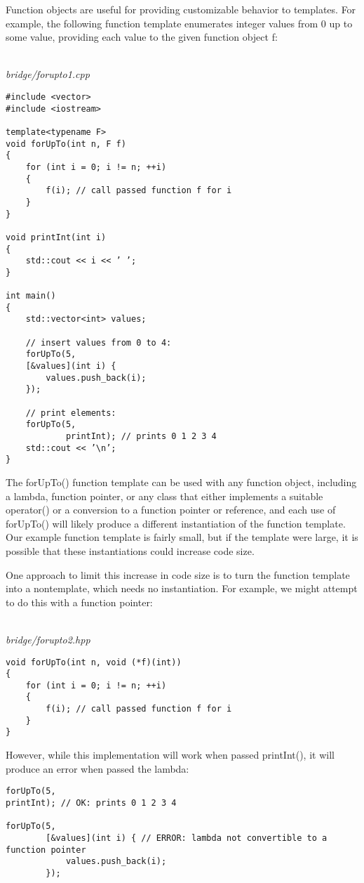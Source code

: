 
Function objects are useful for providing customizable behavior to templates. For example, the following function template enumerates integer values from 0 up to some value, providing each value to the given function object f:

\hspace*{\fill} \\ %
\noindent
\textit{bridge/forupto1.cpp}
\begin{lstlisting}[style=styleCXX]
#include <vector>
#include <iostream>

template<typename F>
void forUpTo(int n, F f)
{
	for (int i = 0; i != n; ++i)
	{
		f(i); // call passed function f for i
	}
}

void printInt(int i)
{
	std::cout << i << ’ ’;
}

int main()
{
	std::vector<int> values;
	
	// insert values from 0 to 4:
	forUpTo(5,
	[&values](int i) {
		values.push_back(i);
	});

	// print elements:
	forUpTo(5,
			printInt); // prints 0 1 2 3 4
	std::cout << ’\n’;
}
\end{lstlisting}

The forUpTo() function template can be used with any function object, including a lambda, function pointer, or any class that either implements a suitable operator() or a conversion to a function pointer or reference, and each use of forUpTo() will likely produce a different instantiation of the function template. Our example function template is fairly small, but if the template were large, it is possible that these instantiations could increase code size.

One approach to limit this increase in code size is to turn the function template into a nontemplate, which needs no instantiation. For example, we might attempt to do this with a function pointer:

\hspace*{\fill} \\ %
\noindent
\textit{bridge/forupto2.hpp}
\begin{lstlisting}[style=styleCXX]
void forUpTo(int n, void (*f)(int))
{
	for (int i = 0; i != n; ++i)
	{
		f(i); // call passed function f for i
	}
}
\end{lstlisting}

However, while this implementation will work when passed printInt(), it will produce an error when passed the lambda:

\begin{lstlisting}[style=styleCXX]
forUpTo(5,
printInt); // OK: prints 0 1 2 3 4

forUpTo(5,
		[&values](int i) { // ERROR: lambda not convertible to a function pointer
			values.push_back(i);
		});
\end{lstlisting}

